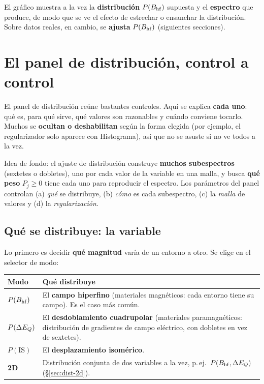 El gráfico muestra a la vez la \textbf{distribución} $P(B_{\mathrm{hf}})$ supuesta y el
\textbf{espectro} que produce, de modo que se ve el efecto de estrechar o
ensanchar la distribución. Sobre datos reales, en cambio, se \textbf{ajusta}
$P(B_{\mathrm{hf}})$ (siguientes secciones).


\section{El panel de distribución, control a control}
\label{sec:panel-dist}

El panel de distribución reúne bastantes controles. Aquí se explica \textbf{cada
uno}: qué es, para qué sirve, qué valores son razonables y cuándo conviene
tocarlo. Muchos se \textbf{ocultan o deshabilitan} según la forma elegida (por
ejemplo, el regularizador solo aparece con Histograma), así que no se asuste si no
ve todos a la vez.

\begin{nota}
Idea de fondo: el ajuste de distribución construye \textbf{muchos subespectros}
(sextetes o dobletes), uno por cada valor de la variable en una malla, y busca
\textbf{qué peso} $P_j\ge 0$ tiene cada uno para reproducir el espectro. Los
parámetros del panel controlan (a) \emph{qué} se distribuye, (b) \emph{cómo} es
cada subespectro, (c) la \emph{malla} de valores y (d) la \emph{regularización}.
\end{nota}

\subsection{Qué se distribuye: la variable}
\label{sec:dist-variable}

Lo primero es decidir \textbf{qué magnitud} varía de un entorno a otro. Se elige
en el selector de modo:

\begin{center}
\begin{tabular}{@{}lp{}@{}}
\toprule
\textbf{Modo} & \textbf{Qué distribuye} \\
\midrule
$P(B_{\mathrm{hf}})$ & El \textbf{campo hiperfino} (materiales magnéticos: cada entorno
tiene su campo). Es el caso más común. \\[3pt]
$P(\Delta E_{Q})$ & El \textbf{desdoblamiento cuadrupolar} (materiales paramagnéticos:
distribución de gradientes de campo eléctrico, con dobletes en vez de sextetes). \\[3pt]
$P(\text{IS})$ & El \textbf{desplazamiento isomérico}. \\[3pt]
\textbf{2D} & Distribución conjunta de dos variables a la vez, p.\,ej.\
$P(B_{\mathrm{hf}},\Delta E_{Q})$ (§\ref{sec:dist-2d}). \\
\bottomrule
\end{tabular}
\end{center}

